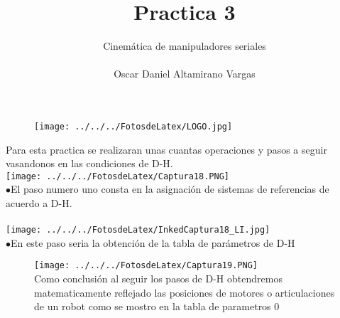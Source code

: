 \documentclass[12pt]{article}
\title{Practica 3}
\author{Cinemática de manipuladores seriales  \\ \\ Oscar Daniel Altamirano Vargas\\}
\begin{document}
 
\maketitle
\begin{figure}[hbtp]
\centering
\texttt{[image: ../../../FotosdeLatex/LOGO.jpg]}
\end{figure}
\pagebreak
Para esta practica se realizaran unas cuantas operaciones y pasos a seguir vasandonos en las condiciones de D-H.\\ 

\texttt{[image: ../../../FotosdeLatex/Captura18.PNG]}  \\

$ \bullet $El paso numero uno consta en la asignación de sistemas de referencias de acuerdo a D-H.\\ \\ 

\texttt{[image: ../../../FotosdeLatex/InkedCaptura18\_LI.jpg]} \\


$ \bullet $En este paso seria la obtención de la tabla de parámetros de D-H \\
\begin{figure}[hbtp]
\centering
\texttt{[image: ../../../FotosdeLatex/Captura19.PNG]}\\ 
Como conclusión al seguir los pasos de D-H obtendremos matematicamente reflejado las posiciones de motores o articulaciones de un robot como se mostro en la tabla de parametros 
0
\end{figure}
\end{document}
